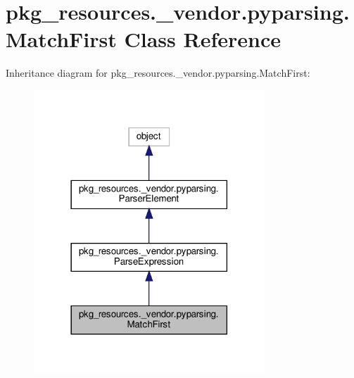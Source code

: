 \hypertarget{classpkg__resources_1_1__vendor_1_1pyparsing_1_1MatchFirst}{}\section{pkg\+\_\+resources.\+\_\+vendor.\+pyparsing.\+Match\+First Class Reference}
\label{classpkg__resources_1_1__vendor_1_1pyparsing_1_1MatchFirst}


Inheritance diagram for pkg\+\_\+resources.\+\_\+vendor.\+pyparsing.\+Match\+First\+:
\nopagebreak
\begin{figure}[H]
\begin{center}
\leavevmode
\includegraphics[width=246pt]{classpkg__resources_1_1__vendor_1_1pyparsing_1_1MatchFirst__inherit__graph}
\end{center}
\end{figure}


